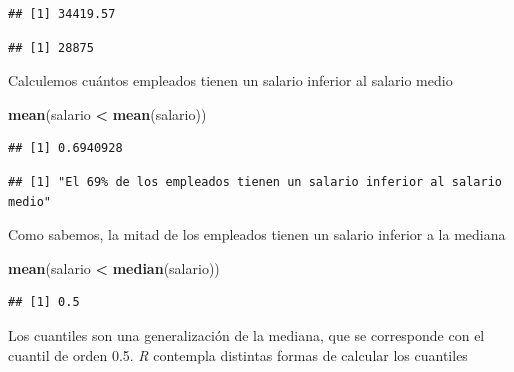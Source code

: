 \documentclass[]{book}
\newenvironment{Shaded}{\begin{snugshade}}{\end{snugshade}}
\newcommand{\DataTypeTok}[1]{\textcolor[rgb]{0.13,0.29,0.53}{#1}}
\newcommand{\DecValTok}[1]{\textcolor[rgb]{0.00,0.00,0.81}{#1}}
\newcommand{\KeywordTok}[1]{\textcolor[rgb]{0.13,0.29,0.53}{\textbf{#1}}}
\newcommand{\NormalTok}[1]{#1}
\newcommand{\OperatorTok}[1]{\textcolor[rgb]{0.81,0.36,0.00}{\textbf{#1}}}
\newcommand{\StringTok}[1]{\textcolor[rgb]{0.31,0.60,0.02}{#1}}
\begin{document}
\begin{verbatim}
## [1] 34419.57
\end{verbatim}

\begin{verbatim}
## [1] 28875
\end{verbatim}

Calculemos cuántos empleados tienen un salario inferior al salario medio

\begin{Shaded}
\begin{Highlighting}[]
\KeywordTok{mean}\NormalTok{(salario }\OperatorTok{<}\StringTok{ }\KeywordTok{mean}\NormalTok{(salario))}
\end{Highlighting}
\end{Shaded}

\begin{verbatim}
## [1] 0.6940928
\end{verbatim}

\begin{Shaded}
\end{Shaded}

\begin{verbatim}
## [1] "El 69% de los empleados tienen un salario inferior al salario medio"
\end{verbatim}

Como sabemos, la mitad de los empleados tienen un salario inferior a la mediana

\begin{Shaded}
\begin{Highlighting}[]
\KeywordTok{mean}\NormalTok{(salario }\OperatorTok{<}\StringTok{ }\KeywordTok{median}\NormalTok{(salario))}
\end{Highlighting}
\end{Shaded}

\begin{verbatim}
## [1] 0.5
\end{verbatim}

Los cuantiles son una generalización de la mediana, que se corresponde con el
cuantil de orden 0.5. \emph{R} contempla distintas formas
de calcular los cuantiles
\end{document}
